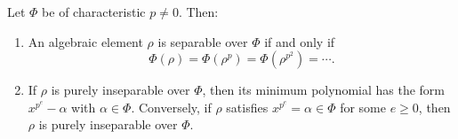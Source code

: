 Let $\Phi$ be of characteristic $p \neq 0$. Then:
\begin{enumerate}
\item[(i)] An algebraic element $\rho$ is separable over $\Phi$ if and only if
  $$\Phi(\rho) = \Phi(\rho^p) = \Phi(\rho^{p^2}) = \cdots.$$
\item[(ii)] If $\rho$ is purely inseparable over $\Phi$, then its minimum polynomial has the form $x^{p^e} - \alpha$ with $\alpha \in \Phi$. Conversely, if $\rho$ satisfies $x^{p^e} = \alpha \in \Phi$ for some $e \geq 0$, then $\rho$ is purely inseparable over $\Phi$.
\end{enumerate}
